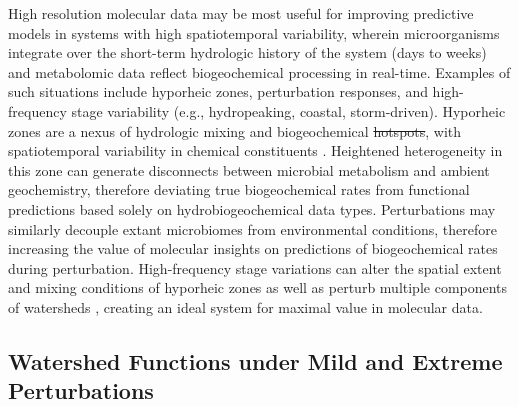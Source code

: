 \documentclass[preprint,review, 12pt]{elsarticle}
\providecommand{\DIFadd}[1]{{\protect\color{blue}\uwave{#1}}} %
\providecommand{\DIFdel}[1]{{\protect\color{red}\sout{#1}}}                      %
\providecommand{\DIFaddbegin}{} %
\providecommand{\DIFaddend}{} %
\providecommand{\DIFdelbegin}{} %
\providecommand{\DIFdelend}{} %
\newcommand{\DIFscaledelfig}{0.5}
\newlength{\DIFdelgraphicswidth} %
\newlength{\DIFdelgraphicsheight} %
\newcommand{\DIFaddincludegraphics}[2][]{{\color{blue}\fbox{\DIFOincludegraphics[#1]{#2}}}} %
\newcommand{\DIFdelincludegraphics}[2][]{%
\sbox{\DIFdelgraphicsbox}{\DIFOincludegraphics[#1]{#2}}%
\settoboxwidth{\DIFdelgraphicswidth}{\DIFdelgraphicsbox} %
\settoboxtotalheight{\DIFdelgraphicsheight}{\DIFdelgraphicsbox} %
\scalebox{\DIFscaledelfig}{%
\parbox[b]{\DIFdelgraphicswidth}{\usebox{\DIFdelgraphicsbox}\\[-\baselineskip] \rule{\DIFdelgraphicswidth}{0em}}\llap{\resizebox{\DIFdelgraphicswidth}{\DIFdelgraphicsheight}{%
\setlength{\unitlength}{\DIFdelgraphicswidth}%
\begin{picture}(1,1)%
\thicklines\linethickness{2pt} %
{\color[rgb]{1,0,0}\put(0,0){\framebox(1,1){}}}%
{\color[rgb]{1,0,0}\put(0,0){\line( 1,1){1}}}%
{\color[rgb]{1,0,0}\put(0,1){\line(1,-1){1}}}%
\end{picture}%
}\hspace*{3pt}}} %
} %
\DeclareRobustCommand{\DIFaddbegin}{\DIFOaddbegin \let\includegraphics\DIFaddincludegraphics} %
\DeclareRobustCommand{\DIFaddend}{\DIFOaddend \let\includegraphics\DIFOincludegraphics} %
\DeclareRobustCommand{\DIFdelbegin}{\DIFOdelbegin \let\includegraphics\DIFdelincludegraphics} %
\DeclareRobustCommand{\DIFdelend}{\DIFOaddend \let\includegraphics\DIFOincludegraphics} %
\begin{document}
High resolution molecular data may be most useful for improving predictive models in systems with high spatiotemporal variability, wherein microorganisms integrate over the short-term hydrologic history of the system (days to weeks) and metabolomic data reflect biogeochemical processing in real-time. Examples of such situations include hyporheic zones, perturbation responses, and high-frequency stage variability (e.g., hydropeaking, coastal, storm-driven). Hyporheic zones are a nexus of hydrologic mixing and biogeochemical \DIFdelbegin \DIFdel{hotspots}\DIFdelend \DIFaddbegin \DIFadd{hot spots}\DIFaddend , with spatiotemporal variability in chemical constituents \citep{Boulton1998, McClain2003, Harvey2015b}. Heightened heterogeneity in this zone can generate disconnects between microbial metabolism and ambient geochemistry, therefore deviating true biogeochemical rates from functional predictions \DIFaddbegin \DIFadd{that are }\DIFaddend based solely on hydrobiogeochemical data types. Perturbations may similarly decouple extant microbiomes from environmental conditions, therefore increasing the value of molecular insights on predictions of biogeochemical rates during perturbation. High-frequency stage variations can alter the spatial extent and mixing conditions of hyporheic zones as well as perturb multiple components of watersheds \citep{Song2018b,Shuai2019b}, creating an ideal system for maximal value in molecular data. 

\subsection{Watershed Functions under Mild and Extreme Perturbations }
\end{document}

